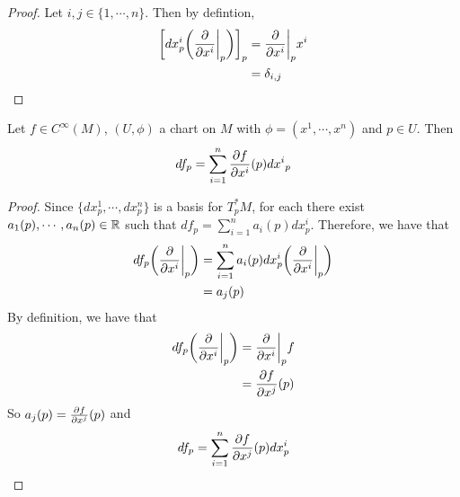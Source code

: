 \documentclass{book}
\begin{document}
	\begin{proof}
		Let $i,j \in \{1, \cdots, n\}$. Then  by defintion,
		\begin{align*}
			\bigg[ dx^i_p \bigg (\frac{\partial}{\partial x^i} \bigg|_p \bigg ) \bigg]_p 
			&= \frac{\partial}{\partial x^i} \bigg|_p x^i \\
			&= \delta_{i,j} \\
		\end{align*}
	\end{proof}
	
	\begin{ex}
		Let $f \in C^{\infty}(M)$, $(U, \phi)$ a chart on $M$ with $\phi = (x^1, \cdots, x^n)$ and $p \in U$. Then $$df_p = \sum_{i=1}^n \frac{\partial f}{\partial x^i}(p) {dx^i}_p$$
	\end{ex}

	\begin{proof}
		 Since $\{dx^1_p, \cdots, dx^n_p\}$ is a basis for $T^*_pM$, for each there exist $a_1(p), \cdots, a_n(p) \in \mathbb{R}$ such that $df_p = \sum\limits_{i=1}^n a_i(p)dx^i_p$. Therefore, we have that 
		\begin{align*}
			df_p \bigg(\frac{\partial}{\partial x^i} \bigg|_p \bigg) 
			&= \sum\limits_{i=1}^n a_i(p)dx^i_p \bigg(\frac{\partial}{\partial x^i} \bigg|_p \bigg)  \\
			&=  a_j(p)
		\end{align*}
		By definition, we have that 
		\begin{align*}
			df_p\bigg(\frac{\partial}{\partial x^i} \bigg|_p \bigg) 
			&= \frac{\partial}{\partial x^i} \bigg|_p f \\ 
			&= \frac{\partial f}{\partial x^j}(p)\\
		\end{align*}
		So $a_j(p) = \frac{\partial f}{\partial x^j} (p)$ and $$df_p = \sum\limits_{i=1}^n \frac{\partial f}{\partial x^j} (p)dx^i_p$$
	\end{proof}
		
	
	
	
	
	
	
	
	
	
	
	
	
	
	
	
	
	
	
	
	
	
	
	
	
	
	
	
	
	
	
	
	
\end{document}
